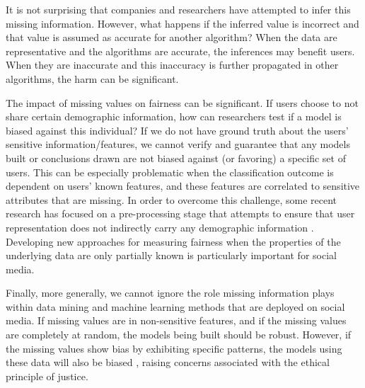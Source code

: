 \documentclass[11pt]{article} %
\begin{document}
It is not surprising that companies and researchers have attempted to infer this missing information. However, what happens if the inferred value is incorrect and that value is assumed as accurate for another algorithm? When the data are representative and the algorithms are accurate, the inferences may benefit users. When they are inaccurate and this inaccuracy is further propagated in other algorithms, the harm can be significant.  

The impact of missing values on fairness can be significant. If users choose to not share certain demographic information, how can researchers test if a model is biased against this individual? If we do not have ground truth about the users' sensitive information/features, we cannot verify and guarantee that any models built or conclusions drawn are not biased against (or favoring) a specific set of users. This can be especially problematic when the classification outcome is dependent on users' known features, and these features are correlated to sensitive attributes that are missing. In order to overcome this challenge, some recent research has focused on a pre-processing stage that attempts to ensure that user representation does not indirectly carry any demographic information \cite{10.1177/2053951717743530,Kamiran2011DataPT}. Developing new approaches for measuring fairness when the properties of the underlying data are only partially known is particularly important for social media.

Finally, more generally, we cannot ignore the role missing information plays within data mining and machine learning methods that are deployed on social media.  If missing values are in non-sensitive features, and if the missing values are completely at random, the models being built should be robust. However, if the missing values show bias by exhibiting specific patterns, the models using these data will also be biased \cite{little2019statistical}, raising concerns associated with the ethical principle of justice. 
\end{document}
